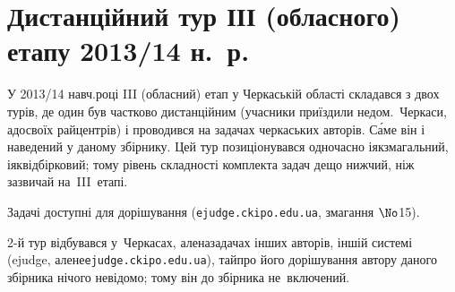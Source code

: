 
\section{Дистанційний тур ІІІ (обласного) етапу 2013/14 н.~р.}

У 2013/14 навч.\nolinebreak[3] році III (обласний) етап у Черкаській області складався з двох турів, де один був частково дистанційним (учасники приїздили не\nolinebreak[3] до\nolinebreak[3] м.~Черкаси, а\nolinebreak[3] до\nolinebreak[3] своїх райцентрів) і проводився на задачах черкаських авторів. С\'{а}ме він і наведений у даному збірнику. Цей тур позиціонувався одночасно і\nolinebreak[2] як\nolinebreak[2] змагальний, і\nolinebreak[2] як\nolinebreak[2] відбірковий; тому рівень складності комплекта задач дещо нижчий, ніж зазвичай на~III~етапі.

Задачі доступні для дорішування (\verb"ejudge.ckipo.edu.ua", змагання $\No$15). 

2-й тур відбувався у~Черкасах, але\nolinebreak[2] на\nolinebreak[2] задачах інших авторів, іншій системі (ejudge, але\nolinebreak[2] не\nolinebreak[2] \verb"ejudge.ckipo.edu.ua"), та\nolinebreak[3] й\nolinebreak[3] про його дорішування автору даного збірника нічого не\nolinebreak[3] відомо; тому він до збірника не~включений.



\renewenvironment{problemAllDefault}[1]{\vspace{10mm}\par\begin{problem}{#1}{Клавіатура (stdin) або файл input.txt}{Екран (stdout)}{1 сек}{64 мегабайти}}{\end{problem}}

	

	

	

	


